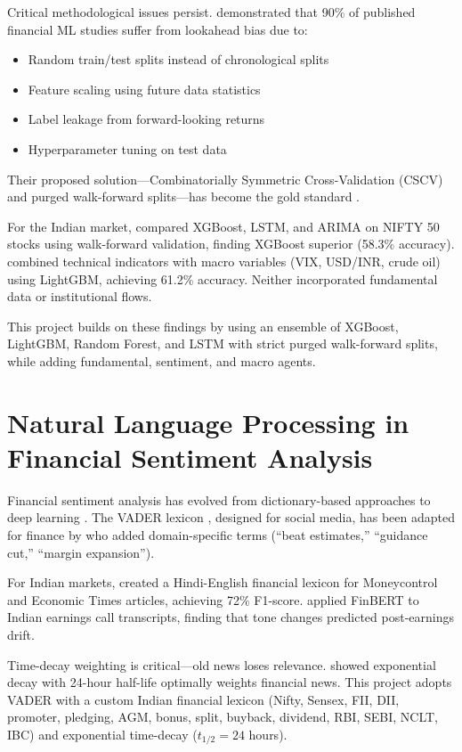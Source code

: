 \documentclass[12pt,a4paper]{report}
\begin{document}
Critical methodological issues persist. \cite{lopez2019machine} demonstrated that 90\% of published financial ML studies suffer from lookahead bias due to:
\begin{itemize}
    \item Random train/test splits instead of chronological splits
    \item Feature scaling using future data statistics
    \item Label leakage from forward-looking returns
    \item Hyperparameter tuning on test data
\end{itemize}
Their proposed solution---Combinatorially Symmetric Cross-Validation (CSCV) and purged walk-forward splits---has become the gold standard \cite{bailey2017purged}.

For the Indian market, \cite{bhat2021machine} compared XGBoost, LSTM, and ARIMA on NIFTY 50 stocks using walk-forward validation, finding XGBoost superior (58.3\% accuracy). \cite{patel2022ensemble} combined technical indicators with macro variables (VIX, USD/INR, crude oil) using LightGBM, achieving 61.2\% accuracy. Neither incorporated fundamental data or institutional flows.

This project builds on these findings by using an ensemble of XGBoost, LightGBM, Random Forest, and LSTM with strict purged walk-forward splits, while adding fundamental, sentiment, and macro agents.

\section{Natural Language Processing in Financial Sentiment Analysis}
Financial sentiment analysis has evolved from dictionary-based approaches \cite{tetlock2007giving} to deep learning \cite{malo2014good}. The VADER lexicon \cite{hutto2014vader}, designed for social media, has been adapted for finance by \cite{li2020adapting} who added domain-specific terms (``beat estimates,'' ``guidance cut,'' ``margin expansion''). 

For Indian markets, \cite{joshi2019sentiment} created a Hindi-English financial lexicon for Moneycontrol and Economic Times articles, achieving 72\% F1-score. \cite{agarwal2021news} applied FinBERT to Indian earnings call transcripts, finding that tone changes predicted post-earnings drift.

Time-decay weighting is critical---old news loses relevance. \cite{garcia2018news} showed exponential decay with 24-hour half-life optimally weights financial news. This project adopts VADER with a custom Indian financial lexicon (Nifty, Sensex, FII, DII, promoter, pledging, AGM, bonus, split, buyback, dividend, RBI, SEBI, NCLT, IBC) and exponential time-decay ($t_{1/2} = 24$ hours).
\end{document}

